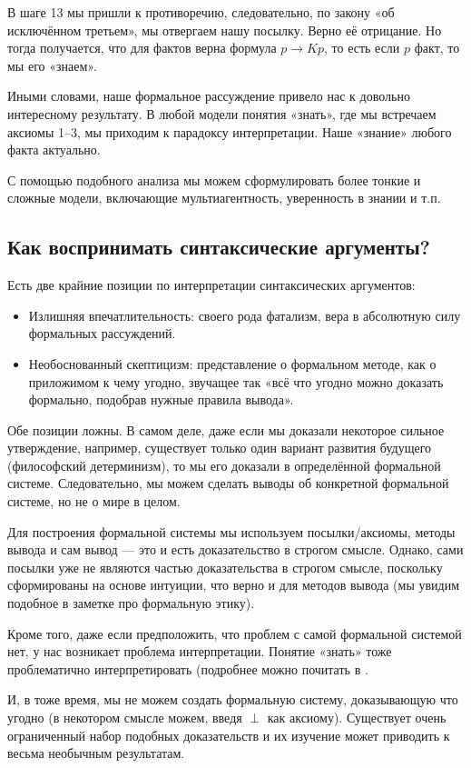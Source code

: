 \documentclass[openany]{book}
\theoremstyle{plain}
\theoremstyle{definition}
\begin{document}
В шаге 13 мы пришли к противоречию, следовательно, по закону «об исключённом третьем», мы отвергаем нашу посылку. Верно её отрицание. Но тогда получается, что для фактов верна формула \(p \to Kp\), то есть если \(p\) факт, то мы его «знаем».

Иными словами, наше формальное рассуждение привело нас к довольно интересному результату. В любой модели понятия «знать», где мы встречаем аксиомы 1–3, мы приходим к парадоксу интерпретации. Наше «знание» любого факта актуально.

С помощью подобного анализа мы можем сформулировать более тонкие и сложные модели, включающие мультиагентность, уверенность в знании и т.п.

\subsection{ Как воспринимать синтаксические аргументы? }

Есть две крайние позиции по интерпретации синтаксических аргументов:\
\begin{itemize}
\item Излишняя впечатлительность:
своего рода фатализм, вера в абсолютную силу формальных рассуждений.
\item Необоснованный скептицизм:
представление о формальном методе, как о приложимом к чему угодно, звучащее так «всё что угодно можно доказать формально, подобрав нужные правила вывода».
\end{itemize}

Обе позиции ложны. В самом деле, даже если мы доказали некоторое сильное утверждение, например, существует только один вариант развития будущего (философский детерминизм), то мы его доказали в определённой формальной системе. Следовательно, мы можем сделать выводы об конкретной формальной системе, но не о мире в целом.

Для построения формальной системы мы используем посылки/аксиомы, методы вывода и сам вывод — это и есть доказательство в строгом смысле. Однако, сами посылки уже не являются частью доказательства в строгом смысле, поскольку сформированы на основе интуиции, что верно и для методов вывода (мы увидим подобное в заметке про формальную этику).

Кроме того, даже если предположить, что проблем с самой формальной системой нет, у нас возникает проблема интерпретации. Понятие «знать» тоже проблематично интерпретировать (подробнее можно почитать в \cite{Lewis}.

И, в тоже время, мы не можем создать формальную систему, доказывающую что угодно (в некотором смысле можем, введя \(\perp\) как аксиому). Существует очень ограниченный набор подобных доказательств и их изучение может приводить к весьма необычным результатам.
\end{document}
